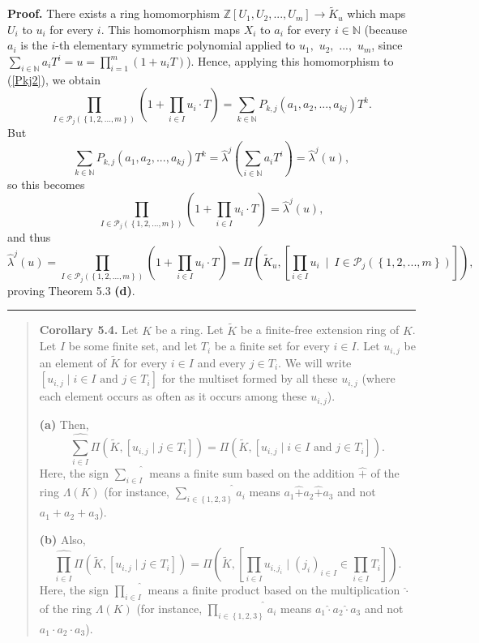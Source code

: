 \documentclass[numbers=enddot,12pt,final,onecolumn,notitlepage]{scrartcl}%
\newenvironment{proof}[1][Proof]{\noindent\textbf{#1.} }{\ \rule{0.5em}{0.5em}}
\begin{document}
\begin{proof}
There exists a ring homomorphism $\mathbb{Z}\left[  U_{1},U_{2},...,U_{m}%
\right]  \rightarrow\widetilde{K}_{u}$ which maps $U_{i}$ to $u_{i}$ for every
$i$. This homomorphism maps $X_{i}$ to $a_{i}$ for every $i\in\mathbb{N}$
(because $a_{i}$ is the $i$-th elementary symmetric polynomial applied to
$u_{1},$ $u_{2},$ $...,$ $u_{m}$, since $\sum\limits_{i\in\mathbb{N}}%
a_{i}T^{i}=u=\prod\limits_{i=1}^{m}\left(  1+u_{i}T\right)  $). Hence,
applying this homomorphism to (\ref{Pkj2}), we obtain%
\[
\prod_{I\in\mathcal{P}_{j}\left(  \left\{  1,2,...,m\right\}  \right)
}\left(  1+\prod_{i\in I}u_{i}\cdot T\right)  =\sum_{k\in\mathbb{N}}%
P_{k,j}\left(  a_{1},a_{2},...,a_{kj}\right)  T^{k}.
\]
But%
\[
\sum_{k\in\mathbb{N}}P_{k,j}\left(  a_{1},a_{2},...,a_{kj}\right)
T^{k}=\widehat{\lambda}^{j}\left(  \sum_{i\in\mathbb{N}}a_{i}T^{i}\right)
=\widehat{\lambda}^{j}\left(  u\right)  ,
\]
so this becomes%
\[
\prod_{I\in\mathcal{P}_{j}\left(  \left\{  1,2,...,m\right\}  \right)
}\left(  1+\prod_{i\in I}u_{i}\cdot T\right)  =\widehat{\lambda}^{j}\left(
u\right)  ,
\]
and thus%
\[
\widehat{\lambda}^{j}\left(  u\right)  =\prod_{I\in\mathcal{P}_{j}\left(
\left\{  1,2,...,m\right\}  \right)  }\left(  1+\prod_{i\in I}u_{i}\cdot
T\right)  =\Pi\left(  \widetilde{K}_{u},\left[  \prod\limits_{i\in I}%
u_{i}\ \mid\ I\in\mathcal{P}_{j}\left(  \left\{  1,2,...,m\right\}  \right)
\right]  \right)  ,
\]
proving Theorem 5.3 \textbf{(d)}.
\end{proof}

\begin{quote}
\textbf{Corollary 5.4.} Let $K$ be a ring. Let $\widetilde{K}$ be a
finite-free extension ring of $K$. Let $I$ be some finite set, and let $T_{i}$
be a finite set for every $i\in I$. Let $u_{i,j}$ be an element of
$\widetilde{K}$ for every $i\in I$ and every $j\in T_{i}$. We will write
$\left[  u_{i,j}\mid i\in I\text{ and }j\in T_{i}\right]  $ for the multiset
formed by all these $u_{i,j}$ (where each element occurs as often as it occurs
among these $u_{i,j}$).

\textbf{(a)} Then,%
\[
\widehat{\sum_{i\in I}}\Pi\left(  \widetilde{K},\left[  u_{i,j}\mid j\in
T_{i}\right]  \right)  =\Pi\left(  \widetilde{K},\left[  u_{i,j}\mid i\in
I\text{ and }j\in T_{i}\right]  \right)  .
\]
Here, the sign $\widehat{\sum\limits_{i\in I}}$ means a finite sum based on
the addition $\widehat{+}$ of the ring $\Lambda\left(  K\right)  $ (for
instance, $\widehat{\sum\limits_{i\in\left\{  1,2,3\right\}  }}a_{i}$ means
$a_{1}\widehat{+}a_{2}\widehat{+}a_{3}$ and not $a_{1}+a_{2}+a_{3}$).

\textbf{(b)} Also,%
\[
\widehat{\prod_{i\in I}}\Pi\left(  \widetilde{K},\left[  u_{i,j}\mid j\in
T_{i}\right]  \right)  =\Pi\left(  \widetilde{K},\left[  \prod_{i\in
I}u_{i,j_{i}}\mid\left(  j_{i}\right)  _{i\in I}\in\prod_{i\in I}T_{i}\right]
\right)  .
\]
Here, the sign $\widehat{\prod\limits_{i\in I}}$ means a finite product based
on the multiplication $\widehat{\cdot}$ of the ring $\Lambda\left(  K\right)
$ (for instance, $\widehat{\prod\limits_{i\in\left\{  1,2,3\right\}  }}a_{i}$
means $a_{1}\widehat{\cdot}a_{2}\widehat{\cdot}a_{3}$ and not $a_{1}\cdot
a_{2}\cdot a_{3}$).
\end{quote}
\end{document}
